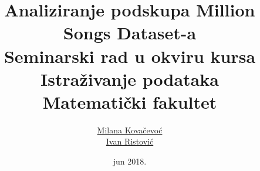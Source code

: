 \documentclass[a4paper]{article}
\begin{document}
\title{Analiziranje podskupa Million Songs Dataset-a\\ \small{Seminarski rad u okviru kursa\\Istra\v{z}ivanje podataka\\ Matematički fakultet}}

\author{\href{mailto:mi14031@matf.bg.ac.rs}{Milana Kova\v{c}evo\'c}\\\href{mailto:mi14042@matf.bg.ac.rs}{Ivan Ristovi\'c}}
\date{jun 2018.}

\maketitle

\tableofcontents

\newpage






\appendix



\appendix

\end{document}
